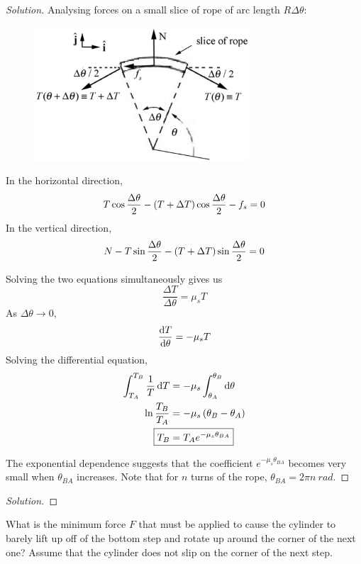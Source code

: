 \begin{proof}[Solution]
Analysing forces on a small slice of rope of arc length $R\Delta\theta$:

\begin{figure}[H]
    \centering
    \includegraphics[width=8cm]{images/Capstan_1.png}
\end{figure}

In the horizontal direction,
\[ T\cos\frac{\Delta\theta}{2} - \left(T+\Delta T\right)\cos\frac{\Delta\theta}{2} - f_s = 0 \]
In the vertical direction,
\[ N - T\sin\frac{\Delta\theta}{2} - \left(T+\Delta T\right)\sin\frac{\Delta\theta}{2} = 0 \]

Solving the two equations simultaneously gives us 
\[ \frac{\Delta T}{\Delta \theta} = \mu_s T \]
As $\Delta \theta \to 0$, 
\[ \dv{T}{\theta} = -\mu_s T \]
Solving the differential equation,
\begin{align*}
\int_{T_A}^{T_B} \frac{1}{T} \dd{T} 
&= -\mu_s \int_{\theta_A}^{\theta_B} \dd{\theta} \\
\ln \frac{T_B}{T_A} &= -\mu_s\brac{\theta_B-\theta_A} \\
\Aboxed{T_B &= T_A e^{-\mu_s \theta_{BA}}}
\end{align*}

The exponential dependence suggests that the coefficient $e^{-\mu_s\theta_{BA}}$ becomes very small when $\theta_{BA}$ increases. Note that for $n$ turns of the rope, $\theta_{BA}=2\pi n\:\unit{rad}$.
\end{proof}
\pagebreak

\begin{prbm}

\end{prbm}

\begin{proof}[Solution]

\end{proof}
\pagebreak

\begin{prbm}
What is the minimum force $F$ that must be applied to cause the cylinder to barely lift up off of the bottom step and rotate up around the corner of the next one? Assume that the cylinder does not slip on the corner of the next step.
\end{prbm}

